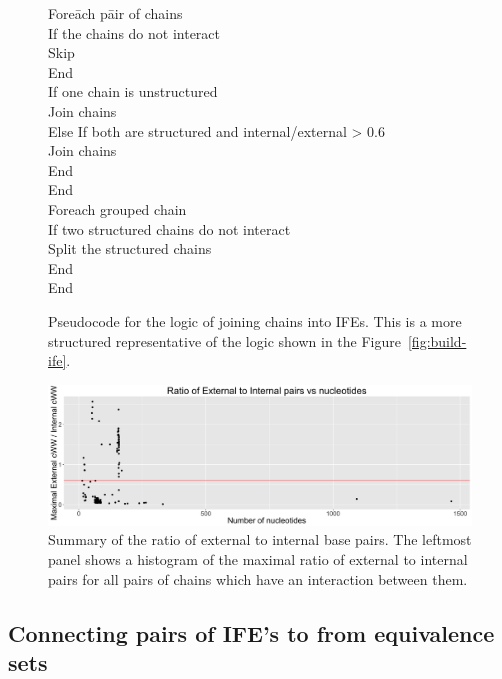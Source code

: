 \begin{figure}
  \begin{tabbing}
    Fore\=ach p\=air of chains \\
      \>If the chains do not interact \\
      \>\>Skip \\
      \>End \\
      \>If one chain is unstructured \\
      \>\>Join chains \\
      \>Else If both are structured and internal/external > 0.6 \\
      \>\>Join chains \\
      \>End \\
    End \\
    Foreach grouped chain \\
    \>If two structured chains do not interact \\
    \>\>Split the structured chains \\
    \>End \\
    End
  \end{tabbing}
  \caption{Pseudocode for the logic of joining chains into IFEs. This is a more
  structured representative of the logic shown in the Figure~\ref{fig:build-ife}.
  }
  \label{fig:pseudo-ife-building}
\end{figure}

\begin{figure}
  \includegraphics[width=\linewidth]{chapter-3/figs/internal-external}
  \caption{Summary of the ratio of external to internal base pairs. The leftmost
    panel shows a histogram of the maximal ratio of external to internal pairs
  for all pairs of chains which have an interaction between them. }
  \label{fig:ext-vs-int}
\end{figure}

\subsection{Connecting pairs of IFE's to from equivalence sets}

